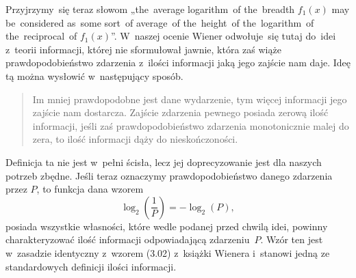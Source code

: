 \documentclass[a4paper,11pt]{article}
\numberwithin{equation}{section}
\begin{document}
Przyjrzymy~się teraz słowom „the~average logarithm~of the~breadth
$f_{ 1 }( x )$ may be~considered as~some sort~of average~of the~height~of
the~logarithm~of the~reciprocal~of $f_{ 1 }( x )$”. W~naszej ocenie Wiener
odwołuje~się tutaj do~idei z~teorii informacji, której nie sformułował
jawnie, która zaś wiąże prawdopodobieństwo zdarzenia z~ilości informacji
jaką jego zajście nam daje. Ideę tą można wysłowić w~następujący sposób.





\begin{quote}

  Im mniej prawdopodobne jest dane wydarzenie, tym więcej informacji jego
  zajście nam dostarcza. Zajście zdarzenia pewnego posiada zerową ilość
  informacji, jeśli zaś prawdopodobieństwo zdarzenia monotonicznie malej
  do zera, to ilość informacji dąży do nieskończoności.

\end{quote}





Definicja ta nie jest w~pełni ścisła, lecz jej doprecyzowanie jest dla
naszych potrzeb zbędne. Jeśli teraz oznaczymy prawdopodobieństwo danego
zdarzenia przez $P$, to funkcja dana wzorem
\begin{equation}
  \label{eq:Winere-Cybernetics-ETC-02}
  \log_{ 2 }\!\left( \frac{ 1 }{ P } \right) = -\log_{ 2 }( P ),
\end{equation}
posiada wszystkie własności, które wedle podanej przed chwilą idei, powinny
charakteryzować ilość informacji odpowiadającą zdarzeniu~$P$.
Wzór ten jest w~zasadzie identyczny z~wzorem (3.02) z~książki Wienera
i~stanowi jedną ze standardowych definicji ilości informacji.
\end{document}
